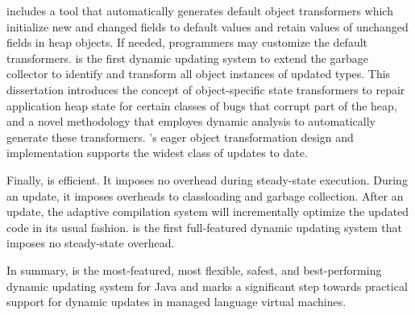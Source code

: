 
\JV includes a tool that automatically generates default object
transformers which initialize new and changed fields to default values and
retain values of unchanged fields in heap objects.  If needed, programmers
may customize the default transformers. \JV is the first dynamic updating
system to extend the garbage collector to identify and transform all object
instances of updated types.  This dissertation introduces the concept of
object-specific state transformers to repair application heap state for
certain classes of bugs that corrupt part of the heap, and a novel
methodology that employes dynamic analysis to automatically generate these
transformers. \JV's eager object transformation design and implementation
supports the widest class of updates to date.

Finally, \JV is efficient. It imposes no overhead during steady-state
execution.  During an update, it imposes overheads to classloading and
garbage collection.  After an update, the adaptive compilation system will
incrementally optimize the updated code in its usual fashion. \JV is the
first full-featured dynamic updating system that imposes no steady-state
overhead.

In summary, \JV is the most-featured, most flexible, safest, and
best-performing dynamic updating system for Java and marks a significant
step towards practical support for dynamic updates in managed language
virtual machines.
